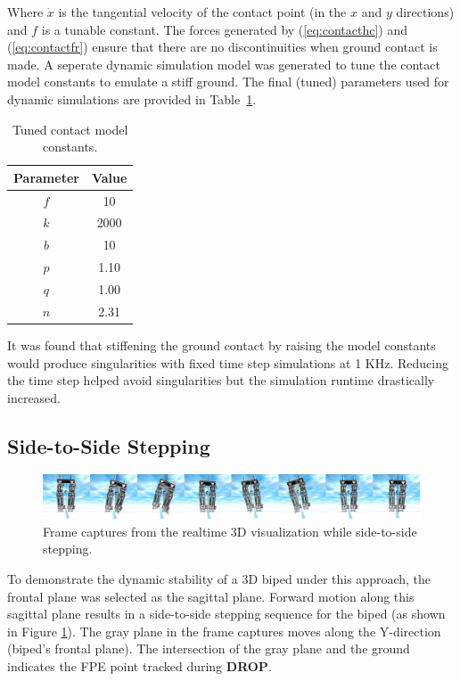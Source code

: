 Where $\dot x$ is the tangential velocity of the contact point (in the $x$ and $y$ directions) and $f$ is a tunable constant. The forces generated by (\ref{eq:contacthc}) and (\ref{eq:contactfr}) ensure that there are no discontinuities when ground contact is made. A seperate dynamic simulation model was generated to tune the contact model constants to emulate a stiff ground. The final (tuned) parameters used for dynamic simulations are provided in Table~\ref{tab:contactk}.

\begin{table}[!h]
  \centering
  \caption{Tuned contact model constants.}
    \begin{tabular}{cc}
    \addlinespace
    \toprule
    \textbf{Parameter} & \textbf{Value}\\
    \midrule
	$f$	&	10 \\
    $k$	&	2000 \\
    $b$	&	10 \\
    $p$	&	1.10 \\
    $q$  &	1.00 \\
    $n$	&	2.31 \\
    \bottomrule
    \end{tabular}
  \label{tab:contactk}
\end{table}

It was found that stiffening the ground contact by raising the model constants would produce singularities with fixed time step simulations at 1 KHz. Reducing the time step helped avoid singularities but the simulation runtime drastically increased. 

\subsection{Side-to-Side Stepping} %
\label{sub:3d_simulations}

\begin{figure}[!h]
	\centering
    \includegraphics[scale=0.095]{fig/simulations/sidesequence.png}
  	\caption{Frame captures from the realtime 3D visualization while side-to-side stepping.}
	\label{fig:sidesequence}
\end{figure}

To demonstrate the dynamic stability of a 3D biped under this approach, the frontal plane was selected as the sagittal plane. Forward motion along this sagittal plane results in a side-to-side stepping sequence for the biped (as shown in Figure \ref{fig:sidesequence}). The gray plane in the frame captures moves along the Y-direction (biped's frontal plane). The intersection of the gray plane and the ground indicates the FPE point tracked during \textbf{DROP}. 

